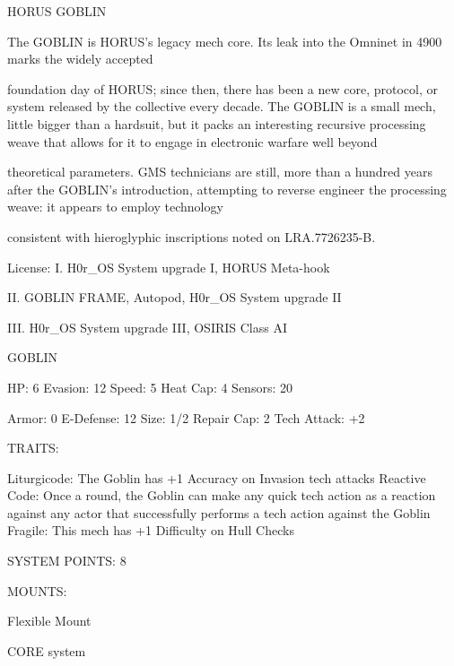                                           HORUS GOBLIN  

The GOBLIN is HORUS’s legacy mech core. Its leak into the Omninet in 4900 marks the widely accepted  

foundation day of HORUS; since then, there has been a new core, protocol, or system released by the  
collective every decade. The GOBLIN is a small mech, little bigger than a hardsuit, but it packs an  
interesting recursive processing weave that allows for it to engage in electronic warfare well beyond  

theoretical parameters. GMS technicians are still, more than a hundred years after the GOBLIN’s  
introduction, attempting to reverse engineer the processing weave: it appears to employ technology  

consistent with hieroglyphic inscriptions noted on LRA.7726235-B.       

                                                  License:  
I. H0r\_OS System upgrade I, HORUS Meta-hook
 
II. GOBLIN FRAME, Autopod, H0r\_OS System upgrade II
 
III. H0r\_OS System upgrade III, OSIRIS Class AI
 

                                                  GOBLIN 

  HP: 6          Evasion: 12                          Speed: 5           Heat Cap: 4       Sensors: 20 

  Armor: 0       E-Defense: 12                        Size: 1/2          Repair Cap: 2     Tech Attack:  
                                                                                           +2 

                                                   TRAITS: 

  Liturgicode: The Goblin has +1 Accuracy on Invasion tech attacks 
  Reactive Code: Once a round, the Goblin can make any quick tech action as a reaction against  
  any actor that successfully performs a tech action against the Goblin 
  Fragile: This mech has +1 Difficulty on Hull Checks 

                                            SYSTEM POINTS: 8 

                                                  MOUNTS: 

  Flexible Mount 

                                                CORE system 

                                                                                                          



